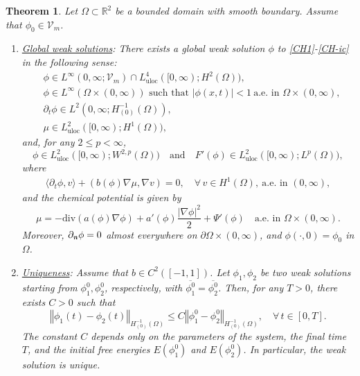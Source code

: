 \documentclass[11pt,reqno]{amsart}
\newtheorem{theorem}{Theorem}[section]
\theoremstyle{remark}
\newcommand \norm[1] {\left\Vert #1\right\Vert}
\def\n{\textbf{\textit{n}}}
\def\R{\mathbb{R}}
\def \l {\langle}
\def \r {\rangle}
\def\div{\mathrm{div}}
\numberwithin{equation}{section}
\newcommand{\uloc}{\operatorname{uloc}}
\begin{document}
\begin{theorem}
\label{well-pos-2D}
Let $\Omega\subset \R^2$ be a bounded domain with smooth boundary. Assume that $\phi_0\in \mathcal{V}_m$. 
\medskip

\begin{enumerate}
\item \underline{Global weak solutions}: There exists a global weak solution $\phi$ to \eqref{CH1}-\eqref{CH-ic} in the following sense:
\begin{align}
\label{WS1}
&\phi \in  L^\infty( 0,\infty; \mathcal{V}_m)\cap L_{\uloc}^4([0,\infty);H^2(\Omega)),
\\
\label{WS2}
&\phi \in L^{\infty}(\Omega\times (0,\infty)) \text{ such that }  |\phi(x,t)|<1  \ \text{a.e. in }\Omega\times (0,\infty),
\\
\label{WS3}
&\partial_t \phi \in L^2(0,\infty; H_{(0)}^{-1}(\Omega)),
\\
\label{WS4}
& \mu \in L_{\uloc}^2([0,\infty);H^1(\Omega)),
\end{align}
and, for any $2\leq p <\infty$,
\begin{equation}
\label{WS5}
\phi\in L_{\uloc}^2([0,\infty);W^{2,p}(\Omega))\quad\text{and}\quad F'(\phi)\in L_{\uloc}^2([0,\infty);L^p(\Omega)),
\end{equation}
where 
\begin{align}
\label{e2}
\l \partial_t \phi,v\r
+ ( b(\phi) \nabla \mu, \nabla v )=0,
\quad \forall \, v \in H^1(\Omega), \ \text{a.e. in } (0,\infty),
\end{align}
and the chemical potential is given by
\begin{equation}
\label{e3}
\mu=-\div \left( a(\phi) \nabla \phi \right) + a'(\phi) \frac{|\nabla \phi|^2}{2}+\Psi'(\phi) \quad \text{a.e. in } \Omega \times (0,\infty).
\end{equation}
Moreover, $\partial_\n \phi=0$ almost everywhere
on $\partial\Omega\times(0,\infty)$, and
$\phi(\cdot,0)=\phi_0$ in $\Omega$.
\medskip

\item \underline{Uniqueness}: Assume that $b \in C^2([-1,1])$. Let $\phi_1, \phi_2$ be two weak solutions starting from $\phi_1^0, \phi_2^0$, respectively, with $\overline{\phi_1^0}=\overline{\phi_2^0}$. Then, for any $T>0$, there exists $C>0$ such that
\begin{equation}
\label{UNIQ}
\norm{\phi_1(t)-\phi_2(t)}_{H_{(0)}^{-1}(\Omega)}
\leq C \norm{ \phi_1^0-\phi_2^0 }_{H_{(0)}^{-1}(\Omega)}\!, \quad \forall \, t \in [0,T].
\end{equation}
The constant $C$ depends only on the parameters of the system, the final time $T$, and the initial free energies $E(\phi_1^0)$ and $E(\phi_2^0)$. In particular, the weak solution is unique.
\medskip


\end{enumerate}
\end{theorem}
\end{document}
